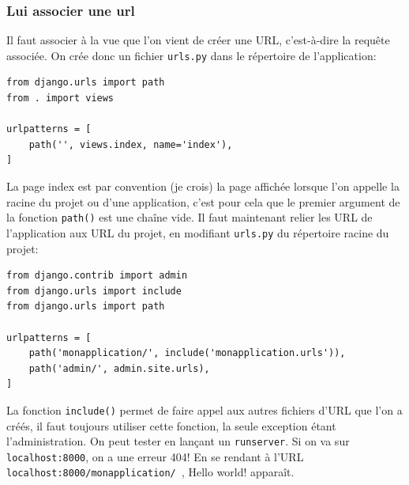\documentclass[a4paper, 10pt]{article}
\begin{document}
\subsubsection{Lui associer une url}
Il faut associer à la vue que l'on vient de créer une URL, c'est-à-dire la requête associée. On crée donc un fichier \texttt{urls.py} dans le répertoire de l'application:
\begin{verbatim}
from django.urls import path
from . import views

urlpatterns = [
    path('', views.index, name='index'),
]
\end{verbatim}

La page \og index \fg{} est par convention (je crois) la page affichée lorsque l'on appelle la racine du projet ou d'une application, c'est pour cela que le premier argument de la fonction \texttt{path()} est une chaîne vide. Il faut maintenant relier les URL de l'application aux URL du projet, en modifiant \texttt{urls.py} du répertoire racine du projet:

\begin{verbatim}
from django.contrib import admin
from django.urls import include
from django.urls import path

urlpatterns = [
    path('monapplication/', include('monapplication.urls')),
    path('admin/', admin.site.urls),
]
\end{verbatim}

La fonction \texttt{include()} permet de faire appel aux autres fichiers d’URL que l'on a créés, il faut toujours utiliser cette fonction, la seule exception étant l'administration. On peut tester en lançant un \texttt{runserver}. Si on va sur \texttt{localhost:8000}, on a une erreur 404! En se rendant à l'URL \texttt{localhost:8000/monapplication/ }, Hello world! apparaît.
\end{document}
